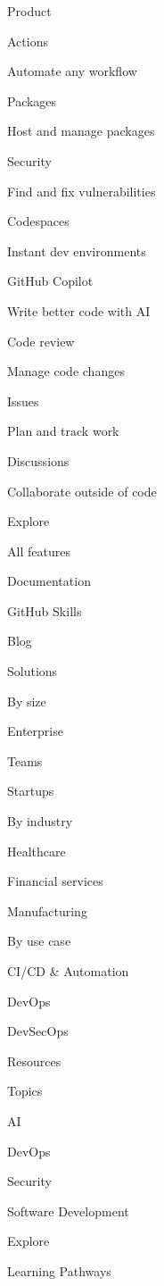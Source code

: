 \documentclass[
  letterpaper,
]{book}
\begin{document}
Product

Actions

Automate any workflow

Packages

Host and manage packages

Security

Find and fix vulnerabilities

Codespaces

Instant dev environments

GitHub Copilot

Write better code with AI

Code review

Manage code changes

Issues

Plan and track work

Discussions

Collaborate outside of code

\label{product-explore-heading}{Explore}

All features

Documentation

GitHub Skills

Blog

Solutions

\label{solutions-by-size-heading}{By size}

Enterprise

Teams

Startups

\label{solutions-by-industry-heading}{By industry}

Healthcare

Financial services

Manufacturing

\label{solutions-by-use-case-heading}{By use case}

CI/CD \& Automation

DevOps

DevSecOps

Resources

\label{resources-topics-heading}{Topics}

AI

DevOps

Security

Software Development

\label{resources-explore-heading}{Explore}

Learning Pathways
\end{document}
